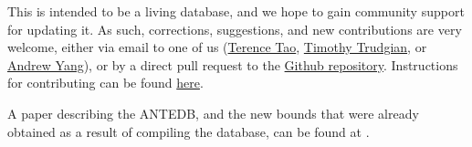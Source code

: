 This is intended to be a living database, and we hope to gain community support for updating it.  As such, corrections, suggestions, and new contributions are very welcome, either via email to one of us (\href{mailto:tao@math.ucla.edu}{Terence Tao}, \href{mailto:timothy.trudgian@unsw.edu.au}{Timothy Trudgian}, or \href{mailto:andrew.yang1@unsw.edu.au}{Andrew Yang}), or by a direct pull request to the \href{https://github.com/teorth/expdb}{Github repository}.  Instructions for contributing can be found \href{https://github.com/teorth/expdb/blob/main/CONTRIBUTING.md}{here}.

A paper describing the ANTEDB, and the new bounds that were already obtained as a result of compiling the database, can be found at \cite{tao-trudgian-yang}.
